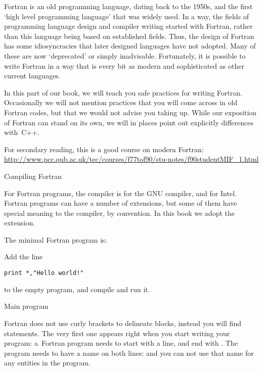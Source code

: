 
Fortran is an old programming language, dating back to the 1950s, and
the first `high level programming language' that was widely used.
In a way, the fields of programming language design and compiler
writing started with Fortran, rather than this language being based on
established fields. Thus, the design of Fortran has some
idiosyncracies that later designed languages have not adopted. Many of
these are now `deprecated' or simply inadvisable. Fortunately, it is
possible to write Fortran in a way that is every bit as modern and
sophisticated as other current languages.

In this part of our book, we will teach you safe practices for
writing Fortran. Occasionally we will not mention practices that you
will come across in old Fortran codes, but that we would not advise
you taking up. While our exposition of Fortran can stand on its own,
we will in places point out explicitly differences with~C++.

For secondary reading, this is a good course on modern Fortran:
\url{http://www.pcc.qub.ac.uk/tec/courses/f77tof90/stu-notes/f90studentMIF_1.html}

 {Compiling Fortran}

For Fortran programs, the compiler is  for the
GNU compiler, and  for Intel.
Fortran programs can have a number of extensions, but some of them
have special meaning to the compiler, by convention. In this book we
adopt the  extension.

The minimal Fortran program is:
%

\begin{exercise}
  Add the line
\begin{verbatim}
print *,"Hello world!"
\end{verbatim}
to the empty program, and compile and run it.
\end{exercise}

 {Main program}

Fortran does not use curly brackets to delineate blocks, instead you
will find  statements. The very first one appears
right when you start writing your program:
a~Fortran program needs to start with a  line, and end with
. The program needs to have a name on both lines:
%
%
and you can not use that name for any entities in the program.

